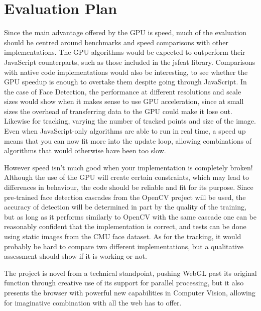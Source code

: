 \documentclass[a4paper]{article}
\begin{document}
\section{Evaluation Plan}

Since the main advantage offered by the GPU is speed, much of the evaluation should be centred around benchmarks and speed comparisons with other implementations. The GPU algorithms would be expected to outperform their JavaScript counterparts, such as those included in the jsfeat \cite{jsfeat} library. Comparisons with native code implementations would also be interesting, to see whether the GPU speedup is enough to overtake them despite going through JavaScript. In the case of Face Detection, the performance at different resolutions and scale sizes would show when it makes sense to use GPU acceleration, since at small sizes the overhead of transferring data to the GPU could make it lose out. Likewise for tracking, varying the number of tracked points and size of the image. Even when JavaScript-only algorithms are able to run in real time, a speed up means that you can now fit more into the update loop, allowing combinations of algorithms that would otherwise have been too slow.

However speed isn't much good when your implementation is completely broken! Although the use of the GPU will create certain constraints, which may lead to differences in behaviour, the code should be reliable and fit for its purpose. Since pre-trained face detection cascades from the OpenCV project will be used, the accuracy of detection will be determined in part by the quality of the training, but as long as it performs similarly to OpenCV with the same cascade one can be reasonably confident that the implementation is correct, and tests can be done using static images from the CMU face dataset. As for the tracking, it would probably be hard to compare two different implementations, but a qualitative assessment should show if it is working or not.

The project is novel from a technical standpoint, pushing WebGL past its original function through creative use of its support for parallel processing, but it also presents the browser with powerful new capabilities in Computer Vision, allowing for imaginative combination with all the web has to offer.
\end{document}
